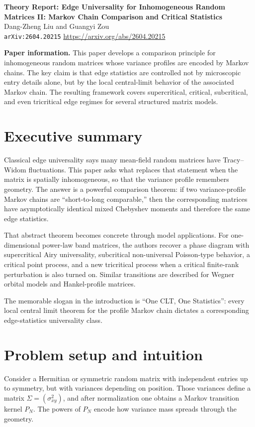 \documentclass[11pt]{article}
\begin{document}
\begin{center}
{\Large \textbf{Theory Report: Edge Universality for Inhomogeneous Random Matrices II: Markov Chain Comparison and Critical Statistics}}\\[0.5em]
{\large Dang-Zheng Liu and Guangyi Zou}\\[0.25em]
\texttt{arXiv:2604.20215} \quad \url{https://arxiv.org/abs/2604.20215}
\end{center}

\textbf{Paper information.} This paper develops a comparison principle for inhomogeneous random matrices whose variance profiles are encoded by Markov chains. The key claim is that edge statistics are controlled not by microscopic entry details alone, but by the local central-limit behavior of the associated Markov chain. The resulting framework covers supercritical, critical, subcritical, and even tricritical edge regimes for several structured matrix models.

\section*{Executive summary}
Classical edge universality says many mean-field random matrices have Tracy--Widom fluctuations. This paper asks what replaces that statement when the matrix is spatially inhomogeneous, so that the variance profile remembers geometry. The answer is a powerful comparison theorem: if two variance-profile Markov chains are ``short-to-long comparable,'' then the corresponding matrices have asymptotically identical mixed Chebyshev moments and therefore the same edge statistics.

That abstract theorem becomes concrete through model applications. For one-dimensional power-law band matrices, the authors recover a phase diagram with supercritical Airy universality, subcritical non-universal Poisson-type behavior, a critical point process, and a new tricritical process when a critical finite-rank perturbation is also turned on. Similar transitions are described for Wegner orbital models and Hankel-profile matrices.

The memorable slogan in the introduction is ``One CLT, One Statistics'': every local central limit theorem for the profile Markov chain dictates a corresponding edge-statistics universality class.

\section*{Problem setup and intuition}
Consider a Hermitian or symmetric random matrix with independent entries up to symmetry, but with variances depending on position. Those variances define a matrix $\Sigma=(\sigma_{xy}^2)$, and after normalization one obtains a Markov transition kernel $P_N$. The powers of $P_N$ encode how variance mass spreads through the geometry.
\end{document}

